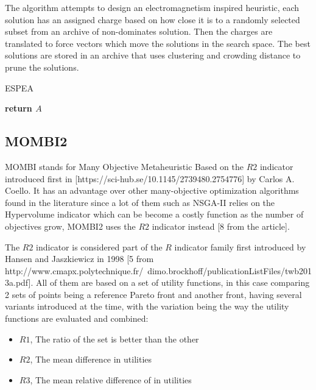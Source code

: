 The algorithm attempts to design an electromagnetism inspired heuristic, each solution has an assigned charge based on how close it is to a randomly selected subset from an archive of non-dominates solution. Then the charges are translated to force vectors which move the solutions in the search space. The best solutions are stored in an archive that uses clustering and crowding distance to prune the solutions.\\

\begin{algorithm}[H]
\label{espea_alg}
\caption{ESPEA}
\SetAlgoLined
{}
\textbf{return $A$}
\end{algorithm}


\subsection{MOMBI2}

MOMBI stands for Many Objective Metaheuristic Based on the $R2$ indicator introduced first in [https://sci-hub.se/10.1145/2739480.2754776] by Carlos A. Coello. It has an advantage over other many-objective optimization algorithms found in the literature since a lot of them such as NSGA-II relies on the Hypervolume indicator which can be become a costly function as the number of objectives grow, MOMBI2 uses the $R2$ indicator instead [8 from the article]. 

The $R2$ indicator is considered part of the $R$ indicator family first introduced by Hansen and Jaszkiewicz in 1998 [5 from http://www.cmapx.polytechnique.fr/~dimo.brockhoff/publicationListFiles/twb2013a.pdf]. All of them are based on a set of utility functions, in this case comparing 2 sets of points being a reference Pareto front and another front,  having several variants introduced at the time, with the variation being the way the utility functions are evaluated and combined:
\begin{itemize}
    \item $R1$, The ratio of the set is better than the other
    \item $R2$, The mean difference in utilities
    \item $R3$, The mean relative difference of in utilities
\end{itemize}

